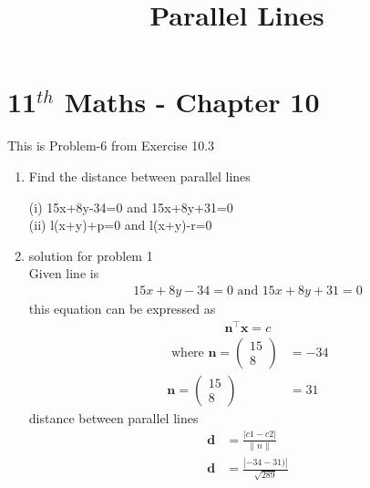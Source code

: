 \documentclass[12pt]{article}
\providecommand{\norm}[1]{\left\lVert#1\right\rVert}
\newcommand{\myvec}[1]{\ensuremath{\begin{pmatrix}#1\end{pmatrix}}}
\let\vec\mathbf
\begin{document}
\begin{center}
\title{\textbf{Parallel Lines}}
\date{\vspace{-5ex}} %
\maketitle
\end{center}
\setcounter{page}{1}
\section*{11$^{th}$ Maths - Chapter 10}
This is Problem-6 from Exercise 10.3
\begin{enumerate}
	\item Find the distance between parallel lines 
	
(i) 15x+8y-34=0 and  15x+8y+31=0 \\
(ii) l(x+y)+p=0 and  l(x+y)-r=0
\	
\item solution for problem 1
\\
Given line is 
\begin{align}
	15x+8y-34=0\text{ and }15x+8y+31=0
\end{align}
this equation can be expressed as 
\begin{align}
	\vec{n}^{\top}\vec{x}=c	
\end{align}
\begin{align}
\text{ where }
		\vec{n} = \myvec{15 \\8}&=-34\\
		\vec{n} = \myvec{15 \\8}&= 31
\end{align} 
distance between parallel lines 
\begin{align}
\vec{d}&=\frac{\left|c1-c2\right|}{\norm{n}}\\
\vec{d}&=\frac{\left|-34-31)\right|}{\sqrt{289}}
\end{align}
		

\end{enumerate}
\end{document}
